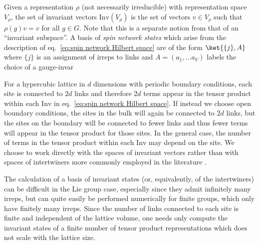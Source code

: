 \begin{figure}[t]
\end{figure}

Given a representation $\rho$ (not necessarily irreducible) with representation space $V_\rho$, the set of invariant vectors $\mathrm{Inv}(V_\rho)$ is the set of vectors $v \in V_\rho$ such that $\rho(g) v = v$ for all $g\in G$.
Note that this is a separate notion from that of an ``invariant subspace''.
A basis of \textit{spin network states} which arise from the description of eq.~\eqref{eq:spin network Hilbert space} are of the form $\ket{\{j\},A}$ where $\{j\}$ is an assignment of irreps to links and $A=(a_1, \ldots a_V)$ labels the choice of a gauge-invar


For a hypercubic lattice in $d$ dimensions with periodic boundary conditions, each site is connected to $2d$ links and therefore $2d$ terms appear in the tensor product within each $\mathrm{Inv}$ in eq.~\eqref{eq:spin network Hilbert space}.
If instead we choose open boundary conditions, the sites in the bulk will again be connected to $2d$ links, but the sites on the boundary will be connected to fewer links and thus fewer terms will appear in the tensor product for those sites.
In the general case, the number of terms in the tensor product within each $\mathrm{Inv}$ may depend on the site.
We choose to work directly with the spaces of invariant vectors rather than with spaces of intertwiners more commonly employed in the literature \cite{baez1996spinnetworks, burgio2000physical}.

The calculation of a basis of invariant states (or, equivalently, of the intertwiners) can be difficult in the Lie group case, especially since they admit infinitely many irreps, but can quite easily be performed numerically for finite groups, which only have finitely many irreps.
Since the number of links connected to each site is finite and independent of the lattice volume, one needs only compute the invariant states of a finite number of tensor product representations which does not scale with the lattice size.

